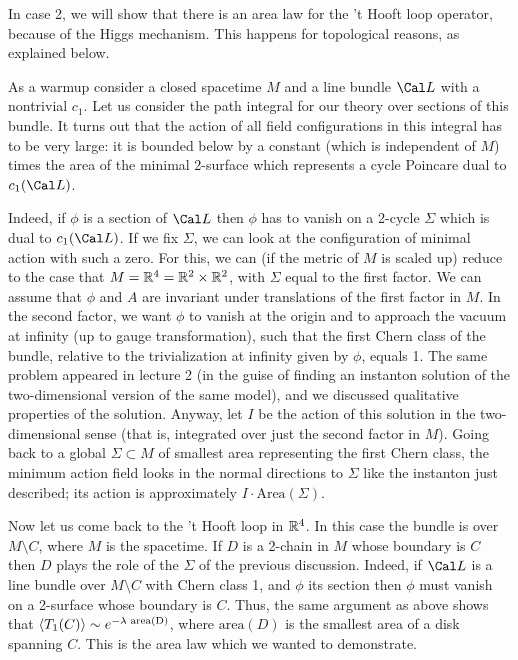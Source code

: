 In case 2, we will show that there is an area law for the 't Hooft loop 
operator, because of the Higgs mechanism. This happens for topological 
reasons, as explained below.  

As a warmup consider a closed spacetime $M$ and a line bundle 
$\Cal L$ with a nontrivial $c_1$. Let us consider the path integral 
for our theory over sections of this bundle. It turns out that 
the action of all field configurations in this integral has to be very large:
it is bounded below by a constant (which is independent of $M$) times
 the area of the minimal 2-surface which represents a cycle 
Poincare dual to $c_1(\Cal L)$. 

Indeed, if $\phi$ is a section of $\Cal L$ then $\phi$ has to vanish 
on a 2-cycle $\Sigma$ which is dual to $c_1(\Cal L)$. If we 
fix $\Sigma$, we can look at the configuration of minimal action
with such a zero.  For this, we can (if the metric of $M$ is scaled
up) reduce to the case that $M=\Bbb R^4=\Bbb R^2\times \Bbb R^2$,
with $\Sigma$ equal to the first factor.  We can assume that $\phi$ and $A$
are invariant under translations of the first factor in $M$.
In the second factor, we want $\phi$ to vanish at the origin and to
approach the vacuum at infinity (up to gauge transformation), such that
the first Chern class of the bundle, relative to the trivialization at
infinity given by $\phi$, equals 1.
The same problem appeared in lecture 2 (in the guise of finding an instanton
solution of the two-dimensional version of the same model), and we
discussed qualitative properties of the solution.
Anyway, let $I$ be the action of this solution in the two-dimensional
sense (that is, integrated over just the second factor in $M$).   
Going back to a global $\Sigma\subset M$ of smallest area representing
the first Chern class, the minimum action field looks in the normal
directions to $\Sigma$ like the instanton just described; its action
is approximately $I\cdot \text{Area}(\Sigma)$.

Now let us come back to the 't Hooft loop in $\Bbb R^4$. 
In this case the bundle is 
over $M\setminus C$, where $M$ is the spacetime. If $D$ is a 
2-chain in $M$ whose boundary is $C$ then $D$ plays 
the role of the $\Sigma$ of the previous discussion. Indeed, if 
$\Cal L$ is a line bundle over $M\setminus C$ with Chern class 1, 
and $\phi$ its section then $\phi$ must vanish on a 2-surface whose boundary 
is $C$. Thus, the same argument as above shows that 
$\langle T_1(C)\rangle\sim e^{-\lambda\text{ area(D)}}$, where $\text{area}(D)$ is the 
smallest 
area of a disk spanning $C$. This is the area law which we wanted to 
demonstrate. 

